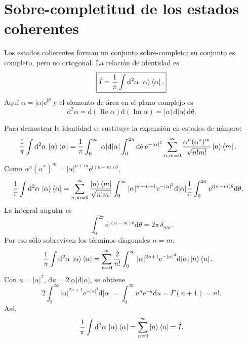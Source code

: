 \documentclass[11pt]{article}
\newcommand{\ii}{\mathrm{i}}
\newcommand{\ee}{\mathrm{e}}
\newcommand{\dd}{\mathrm{d}}
\newcommand{\Real}{\operatorname{Re}}
\newcommand{\Imag}{\operatorname{Im}}
\begin{document}
\section{Sobre-completitud de los estados coherentes}

Los estados coherentes forman un conjunto sobre-completo: su conjunto es
completo, pero no ortogonal. La relaci\'on de identidad es
\begin{equation}
  \boxed{
  \hat I
  =
  \frac1\pi\int \dd^2\alpha\,\ket\alpha\bra\alpha.
  }
\end{equation}
Aqu\'i $\alpha=|\alpha|\ee^{\ii\theta}$ y el elemento de \'area en el plano
complejo es
\begin{equation}
  \dd^2\alpha
  =
  \dd(\Real\alpha)\dd(\Imag\alpha)
  =
  |\alpha|\,\dd|\alpha|\,\dd\theta.
\end{equation}

Para demostrar la identidad se sustituye la expansi\'on en estados de n\'umero:
\begin{align}
  \frac1\pi\int\dd^2\alpha\,\ket\alpha\bra\alpha
  &=
  \frac1\pi
  \int_0^\infty |\alpha|\dd|\alpha|
  \int_0^{2\pi}\dd\theta\,
  \ee^{-|\alpha|^2}
  \sum_{n,m=0}^{\infty}
  \frac{\alpha^n(\alpha^*)^m}{\sqrt{n!m!}}
  \ket n\bra m.
\end{align}
Como $\alpha^n(\alpha^*)^m=|\alpha|^{n+m}\ee^{\ii(n-m)\theta}$,
\begin{align}
  \frac1\pi\int\dd^2\alpha\,\ket\alpha\bra\alpha
  &=
  \sum_{n,m=0}^{\infty}
  \frac{\ket n\bra m}{\sqrt{n!m!}}
  \int_0^\infty |\alpha|^{n+m+1}\ee^{-|\alpha|^2}\dd|\alpha|
  \frac1\pi\int_0^{2\pi}\ee^{\ii(n-m)\theta}\dd\theta.
\end{align}
La integral angular es
\begin{equation}
  \int_0^{2\pi}\ee^{\ii(n-m)\theta}\dd\theta
  =
  2\pi\,\delta_{nm}.
\end{equation}
Por eso s\'olo sobreviven los t\'erminos diagonales $n=m$:
\begin{align}
  \frac1\pi\int\dd^2\alpha\,\ket\alpha\bra\alpha
  &=
  \sum_{n=0}^{\infty}
  \frac{2}{n!}
  \int_0^\infty
  |\alpha|^{2n+1}\ee^{-|\alpha|^2}\dd|\alpha|
  \ket n\bra n.
\end{align}
Con $u=|\alpha|^2$, $\dd u=2|\alpha|\dd|\alpha|$, se obtiene
\begin{equation}
  2\int_0^\infty
  |\alpha|^{2n+1}\ee^{-|\alpha|^2}\dd|\alpha|
  =
  \int_0^\infty u^n\ee^{-u}\dd u
  =
  \Gamma(n+1)=n!.
\end{equation}
As\'i,
\begin{equation}
  \frac1\pi\int\dd^2\alpha\,\ket\alpha\bra\alpha
  =
  \sum_{n=0}^{\infty}\ket n\bra n
  =
  \hat I.
\end{equation}
\end{document}
